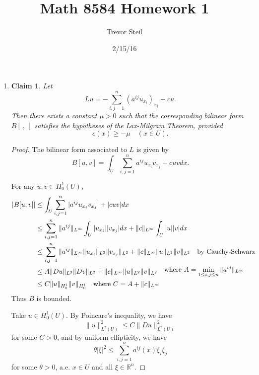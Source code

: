\documentclass[a4paper]{article}
\title{Math 8584 Homework 1 }
\date{2/15/16}
\author{Trevor Steil}
\newtheorem*{claim}{Claim}
\newcommand{\R}{\mathbb{R}}
\begin{document}
\maketitle

\begin{enumerate}
  \item \begin{claim}
  Let
  \[ Lu = - \sum_{i,j=1}^n \left( a^{ij} u_{x_i} \right)_{x_j} + cu .\]
  Then there exists a constant $\mu > 0$ such that the corresponding bilinear form $B[\ , \ ]$ satisfies the hypotheses of the Lax-Milgram Theorem, provided
  \[ c(x) \geq - \mu \quad (x \in U).\]
\end{claim}

\begin{proof}

  The bilinear form associated to $L$ is given by
  \[ B[u,v] = \int_{U}^{} \sum_{i,j=1}^n a^{ij} u_{x_i} v_{x_j} + cuv dx .\]

  For any $u,v \in H_0^1(U)$,
  \begin{align*}
    | B[u,v] | &\leq \int_{U}^{} \sum_{i,j=1}^n |a^{ij} u_{x_i} v_{x_j}| + |c u v| dx \\
    &\leq \sum_{i,j=1}^n \|a^{ij}\|_{L^\infty} \int_{U}^{} |u_{x_i}| |v_{x_j}| dx + \|c\|_{L^\infty} \int_{U}^{} |u| |v| dx \\
    &\leq \sum_{i,j=1}^n \|a^{ij}\|_{L^\infty} \|u_{x_i}\|_{L^2} \|v_{x_j}\|_{L^2} + \|c\|_{L^\infty} \|u\|_{L^2} \|v\|_{L^2} \quad \parbox{3cm}{by Cauchy-Schwarz} \\
    &\leq A \|Du\|_{L^2} \|Dv\|_{L^2} + \|c\|_{L^\infty} \|u\|_{L^2} \|v\|_{L^2} \quad \parbox{5cm}{where ${A = \min\limits_{1 \leq i,j \leq n} \|a^{ij}\|_{L^\infty}}$} \\
    &\leq C \|u\|_{H_0^1} \|v\|_{H_0^1} \quad \parbox{4cm}{where $C = A + \|c\|_{L^\infty}$} \\
  \end{align*}
  Thus $B$ is bounded.

  Take $u \in H_0^1(U)$. By Poincare's inequality, we have
  \[ \|u\|_{L^2(U)}^2 \leq C \|Du\|_{L^2(U)}^2 \]
  for some $C>0$, and by uniform ellipticity, we have
  \[ \theta |\xi|^2 \leq \sum_{i,j=1}^n a^{ij}(x) \xi_i \xi_j \]
  for some $\theta > 0$, a.e. $x \in U$ and all $\xi \in \R^n$.


\end{proof}
\end{enumerate}
\end{document}
